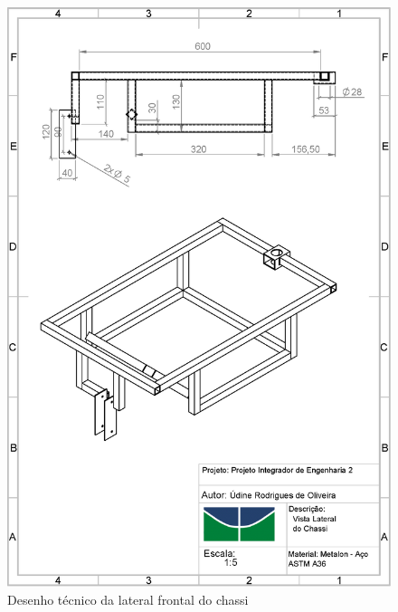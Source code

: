 \begin{apendicesenv}
\begin{figure}[!htbp]
	\centering
	\includegraphics[width=\textwidth]{figuras/chassi_lateral.eps}
	\caption{Desenho técnico da lateral frontal do chassi}
\end{figure}


\end{apendicesenv}

